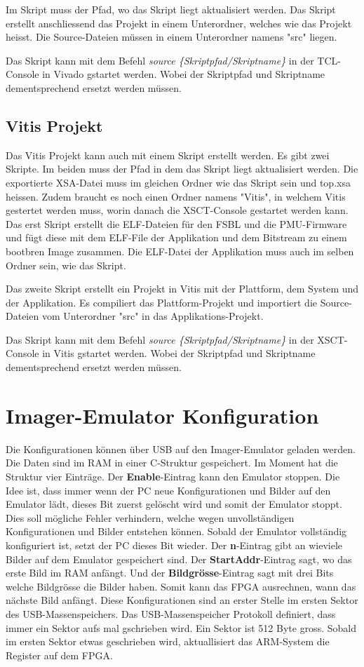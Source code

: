\documentclass{article}
\begin{document}
Im Skript muss der Pfad, wo das Skript liegt aktualisiert werden. Das Skript erstellt anschliessend das Projekt in einem Unterordner, welches wie das Projekt heisst. Die Source-Dateien müssen in einem Unterordner namens "src" liegen.

Das Skript kann mit dem Befehl \textit{source \{Skriptpfad/Skriptname\}} in der TCL-Console in Vivado gstartet werden. Wobei der Skriptpfad und Skriptname dementsprechend ersetzt werden müssen.

\subsection{Vitis Projekt}
Das Vitis Projekt kann auch mit einem Skript erstellt werden. Es gibt zwei Skripte. Im beiden muss der Pfad in dem das Skript liegt aktualisiert werden. Die exportierte XSA-Datei muss im gleichen Ordner wie das Skript sein und top.xsa heissen. Zudem braucht es noch einen Ordner namens "Vitis", in welchem Vitis gestertet werden muss, worin danach die XSCT-Console gestartet werden kann. Das erst Skript erstellt die ELF-Dateien für den FSBL und die PMU-Firmware und fügt diese mit dem ELF-File der Applikation und dem Bitstream zu einem bootbren Image zusammen. Die ELF-Datei der Applikation muss auch im selben Ordner sein, wie das Skript.

Das zweite Skript erstellt ein Projekt in Vitis mit der Plattform, dem System und der Applikation. Es compiliert das Plattform-Projekt und importiert die Source-Dateien vom Unterordner "src" in das Applikations-Projekt.  

Das Skript kann mit dem Befehl \textit{source \{Skriptpfad/Skriptname\}} in der XSCT-Console in Vitis gstartet werden. Wobei der Skriptpfad und Skriptname dementsprechend ersetzt werden müssen.

\section{Imager-Emulator Konfiguration}
Die Konfigurationen können über USB auf den Imager-Emulator geladen werden. Die Daten sind im RAM in einer C-Struktur gespeichert. Im Moment hat die Struktur vier Einträge. Der \textbf{Enable}-Eintrag kann den Emulator stoppen. Die Idee ist, dass immer wenn der PC neue Konfigurationen und Bilder auf den Emulator lädt, dieses Bit zuerst gelöscht wird und somit der Emulator stoppt. Dies soll mögliche Fehler verhindern, welche wegen unvollständigen Konfigurationen und Bilder entstehen können. Sobald der Emulator vollständig konfiguriert ist, setzt der PC dieses Bit wieder. Der \textbf{n}-Eintrag gibt an wieviele Bilder auf dem Emulator gespeichert sind. Der \textbf{StartAddr}-Eintrag sagt, wo das erste Bild im RAM anfängt. Und der \textbf{Bildgrösse}-Eintrag sagt mit drei Bits welche Bildgrösse die Bilder haben. Somit kann das FPGA ausrechnen, wann das nächste Bild anfängt. Diese Konfigurationen sind an erster Stelle im ersten Sektor des USB-Massenspeichers. Das USB-Massenspeicher Protokoll definiert, dass immer ein Sektor aufs mal gschrieben wird. Ein Sektor ist 512 Byte gross. Sobald im ersten Sektor etwas geschrieben wird, aktuallisiert das ARM-System die Register auf dem FPGA.
\end{document}
